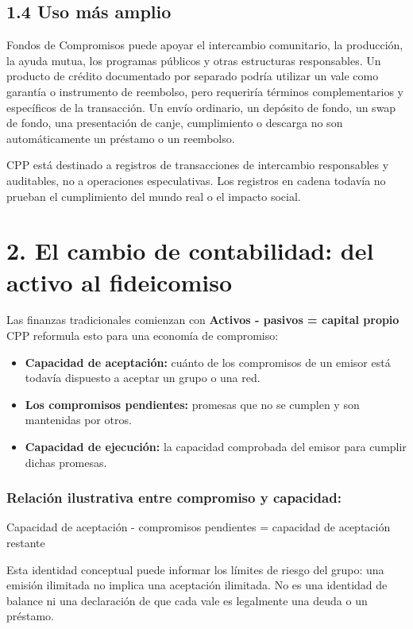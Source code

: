 \documentclass[11pt]{article}
\begin{document}
\subsection*{1.4 Uso más amplio}

Fondos de Compromisos puede apoyar el intercambio comunitario, la producción, la ayuda mutua, los programas públicos y otras estructuras responsables. Un producto de crédito documentado por separado podría utilizar un vale como garantía o instrumento de reembolso, pero requeriría términos complementarios y específicos de la transacción. Un envío ordinario, un depósito de fondo, un swap de fondo, una presentación de canje, cumplimiento o descarga no son automáticamente un préstamo o un reembolso.

CPP está destinado a registros de transacciones de intercambio responsables y auditables, no a operaciones especulativas. Los registros en cadena todavía no prueban el cumplimiento del mundo real o el impacto social.


\section*{2. El cambio de contabilidad: del activo al fideicomiso}

Las finanzas tradicionales comienzan con \textbf{Activos - pasivos = capital propio} CPP reformula esto para una economía de compromiso:

\begin{itemize}[leftmargin=*]
\item \textbf{Capacidad de aceptación:} cuánto de los compromisos de un emisor está todavía dispuesto a aceptar un grupo o una red.
\item \textbf{Los compromisos pendientes:} promesas que no se cumplen y son mantenidas por otros.
\item \textbf{Capacidad de ejecución:} la capacidad comprobada del emisor para cumplir dichas promesas.
\end{itemize}
\subsubsection*{Relación ilustrativa entre compromiso y capacidad:}

Capacidad de aceptación - compromisos pendientes = capacidad de aceptación restante

Esta identidad conceptual puede informar los límites de riesgo del grupo: una emisión ilimitada no implica una aceptación ilimitada. No es una identidad de balance ni una declaración de que cada vale es legalmente una deuda o un préstamo.
\end{document}
